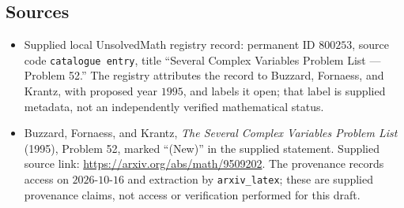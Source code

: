 \documentclass[11pt]{article}
\begin{document}
\subsection{Sources}
\begin{itemize}
\item Supplied local UnsolvedMath registry record: permanent ID \(800253\), source code \texttt{catalogue entry}, title ``Several Complex Variables Problem List --- Problem 52.'' The registry attributes the record to Buzzard, Fornaess, and Krantz, with proposed year \(1995\), and labels it open; that label is supplied metadata, not an independently verified mathematical status.
\item Buzzard, Fornaess, and Krantz, \emph{The Several Complex Variables Problem List} (1995), Problem 52, marked ``(New)'' in the supplied statement. Supplied source link: \url{https://arxiv.org/abs/math/9509202}. The provenance records access on \(2026\text{-}10\text{-}16\) and extraction by \texttt{arxiv\_latex}; these are supplied provenance claims, not access or verification performed for this draft.
\end{itemize}
\end{document}
